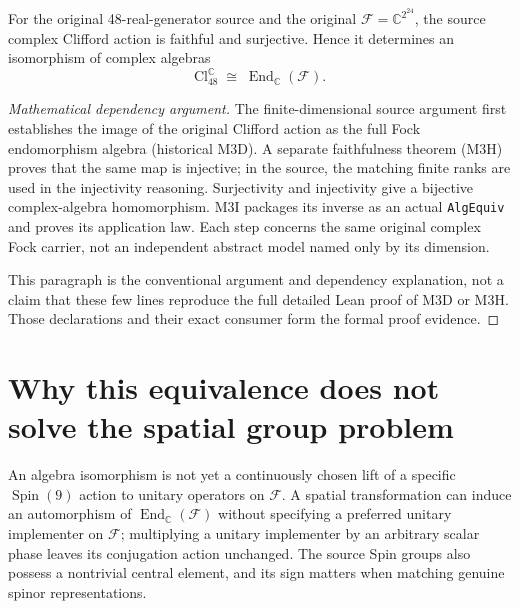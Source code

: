 \begin{theorem}\label{thm:clifford-equivalence}
For the original 48-real-generator source and the original
$\mathcal F=\mathbb C^{2^{24}}$, the source complex Clifford action is
faithful and surjective. Hence it determines an isomorphism of complex
algebras
\begin{equation}\label{eq:clifford-end}
 \mathrm{Cl}_{48}^{\mathbb C}
 \;\cong\;\operatorname{End}_{\mathbb C}(\mathcal F).
\end{equation}
\end{theorem}
\begin{proof}[Mathematical dependency argument]
The finite-dimensional source argument first establishes the image of the
original Clifford action as the full Fock endomorphism algebra (historical
M3D). A separate faithfulness theorem (M3H) proves that the same map is
injective; in the source, the matching finite ranks are used in the
injectivity reasoning. Surjectivity and injectivity give a bijective
complex-algebra homomorphism. M3I packages its inverse as an actual
\texttt{AlgEquiv} and proves its application law. Each step concerns the
same original complex Fock carrier, not an independent abstract model
named only by its dimension.

This paragraph is the conventional argument and dependency explanation,
not a claim that these few lines reproduce the full detailed Lean proof of
M3D or M3H. Those declarations and their exact consumer form the formal
proof evidence.
\end{proof}

\section{Why this equivalence does not solve the spatial group problem}
An algebra isomorphism is not yet a continuously chosen lift of a specific
$\operatorname{Spin}(9)$ action to unitary operators on $\mathcal F$. A
spatial transformation can induce an automorphism of
$\operatorname{End}_{\mathbb C}(\mathcal F)$ without specifying a preferred
unitary implementer on $\mathcal F$; multiplying a unitary implementer by
an arbitrary scalar phase leaves its conjugation action unchanged. The
source Spin groups also possess a nontrivial central element, and its
sign matters when matching genuine spinor representations.

